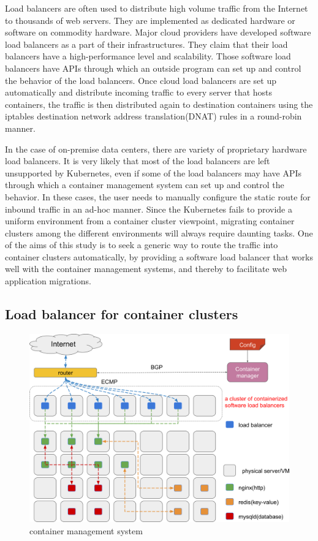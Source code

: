 Load balancers are often used to distribute high volume traffic from the Internet to thousands of web servers.
They are implemented as dedicated hardware or software on commodity hardware.
Major cloud providers have developed software load balancers\cite{eisenbud2016maglev,patel2013ananta} as a part of their infrastructures.
They claim that their load balancers have a high-performance level and scalability.
Those software load balancers have APIs through which an outside program can set up and control the behavior of the load balancers.
Once cloud load balancers are set up automatically and distribute incoming traffic to every server that hosts containers,
the traffic is then distributed again to destination containers using the iptables destination network address translation(DNAT)\cite{MartinA.Brown2017,Marmol2015} rules in a round-robin manner.

In the case of on-premise data centers, there are variety of proprietary hardware load balancers.
It is very likely that most of the load balancers are left unsupported by Kubernetes, even if some of the load balancers may have APIs through which a container management system can set up and control the behavior.
In these cases, the user needs to manually configure the static route for inbound traffic in an ad-hoc manner.
Since the Kubernetes fails to provide a uniform environment from a container cluster viewpoint, migrating container clusters among the different environments will always require daunting tasks.
One of the aims of this study is to seek a generic way to route the traffic into container clusters automatically, by providing a software load balancer that works well with the container management systems, and thereby to facilitate web application migrations.


\subsection{Load balancer for container clusters}

\begin{figure}[h]
\begin{center}
\includegraphics[width=0.9\columnwidth]{Figs/cluster_of_container_loadbalancer}
\end{center}
\caption{
container management system
}

\label{fig:cluster_of_container_loadbalancer}
\end{figure}

